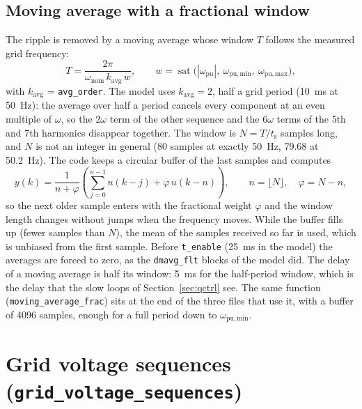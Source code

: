 \documentclass[11pt,a4paper]{scrartcl}
\newcommand{\ped}[1]{_{\mathrm{#1}}}
\newcommand{\code}[1]{\texttt{#1}}
\newcommand{\sat}{\operatorname{sat}}
\begin{document}
\begin{onehalfspace}
\subsection{Moving average with a fractional window}
\label{sec:mavg}

The ripple is removed by a moving average whose window $T$ follows the measured grid frequency:
\begin{equation}
	T = \frac{2\pi}{\omega\ped{nom}\, k\ped{avg}\, w}, \qquad w = \sat\!\big(|\omega\ped{pu}|,\ \omega\ped{pu,min},\ \omega\ped{pu,max}\big),
	\label{eq:window}
\end{equation}
with $k\ped{avg}$ = \code{avg\_order}. The model uses $k\ped{avg} = 2$, half a grid period (\SI{10}{\milli\second} at \SI{50}{\hertz}): the average over half a period cancels every component at an even multiple of $\omega$, so the $2\omega$ term of the other sequence and the $6\omega$ terms of the 5th and 7th harmonics disappear together. The window is $N = T/t\ped{s}$ samples long, and $N$ is not an integer in general (80 samples at exactly \SI{50}{\hertz}, 79.68 at \SI{50.2}{\hertz}). The code keeps a circular buffer of the last samples and computes
\begin{equation}
	y(k) = \frac{1}{n + \varphi}\left(\sum_{j=0}^{n-1} u(k-j) + \varphi\, u(k-n)\right), \qquad n = \lfloor N \rfloor,\quad \varphi = N - n,
	\label{eq:mavg}
\end{equation}
so the next older sample enters with the fractional weight $\varphi$ and the window length changes without jumps when the frequency moves. While the buffer fills up (fewer samples than $N$), the mean of the samples received so far is used, which is unbiased from the first sample. Before \code{t\_enable} (\SI{25}{\milli\second} in the model) the averages are forced to zero, as the \code{dmavg\_flt} blocks of the model did. The delay of a moving average is half its window: \SI{5}{\milli\second} for the half-period window, which is the delay that the slow loops of Section~\ref{sec:qctrl} see. The same function (\code{moving\_average\_frac}) sits at the end of the three files that use it, with a buffer of 4096 samples, enough for a full period down to $\omega\ped{pu,min}$.

\section{Grid voltage sequences (\code{grid\_voltage\_sequences})}
\label{sec:vseq}


\end{onehalfspace}
\end{document}
